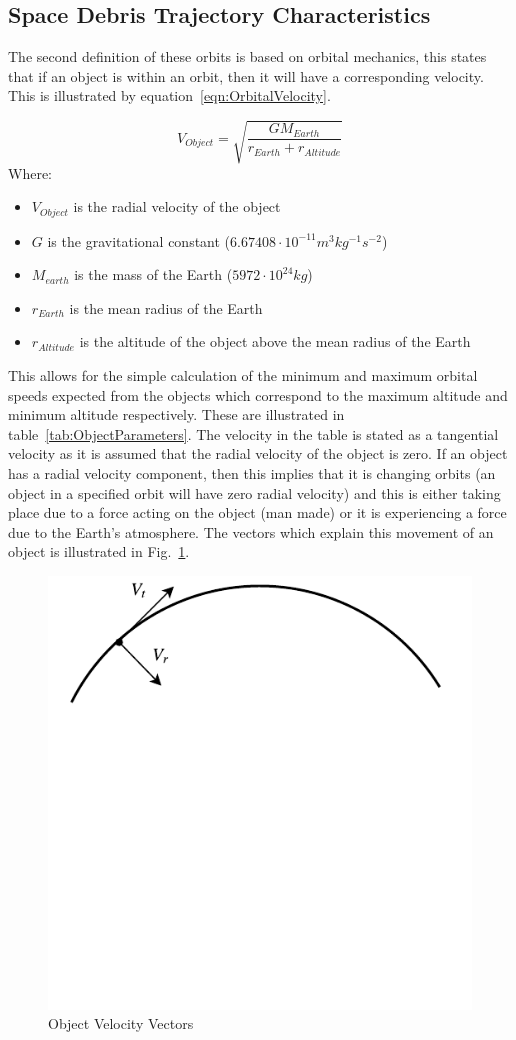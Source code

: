 \documentclass[11pt]{witseiepaper}
\begin{document}
\begin{bibunit}[witseie]
\subsection{Space Debris Trajectory Characteristics} \label{sec:SpaceDebrisTrajectoryCharacteristics}
The second definition of these orbits is based on orbital mechanics, this states that if an object is within an orbit, then it will have a corresponding velocity.
This is illustrated by equation~\ref{eqn:OrbitalVelocity}. 

\begin{equation} \label{eqn:OrbitalVelocity}
    V_{Object} = \sqrt{\frac{G M_{Earth}}{r_{Earth} + r_{Altitude}}}
\end{equation}
Where:
\begin{itemize}
    \item $V_{Object}$ is the radial velocity of the object
    \item $G$ is the gravitational constant ($6.67408 \cdot 10^{-11} m^3 kg^{-1} s^{-2}$)
    \item $M_{earth}$ is the mass of the Earth ($5972 \cdot 10^{24} kg$)
    \item $r_{Earth}$ is the mean radius of the Earth
    \item $r_{Altitude}$ is the altitude of the object above the mean radius of the Earth
\end{itemize}

This allows for the simple calculation of the minimum and maximum orbital speeds expected from the objects which correspond to the maximum altitude and minimum altitude respectively. These are illustrated in table~\ref{tab:ObjectParameters}. The velocity in the table is stated as a tangential velocity as it is assumed that the radial velocity of the object is zero. If an object has a radial velocity component, then this implies that it is changing orbits (an object in a specified orbit will have zero radial velocity) and this is either taking place due to a force acting on the object (man made) or it is experiencing a force due to the Earth's atmosphere. The vectors which explain this movement of an object is illustrated in Fig.~\ref{fig:ObjectVelocityVectors}.

\begin{figure}[htb]
\centering
\includegraphics[width=0.5\linewidth]{Vectors.pdf}
\caption{Object Velocity Vectors}
\label{fig:ObjectVelocityVectors}
\end{figure}


\end{bibunit}
\end{document}
